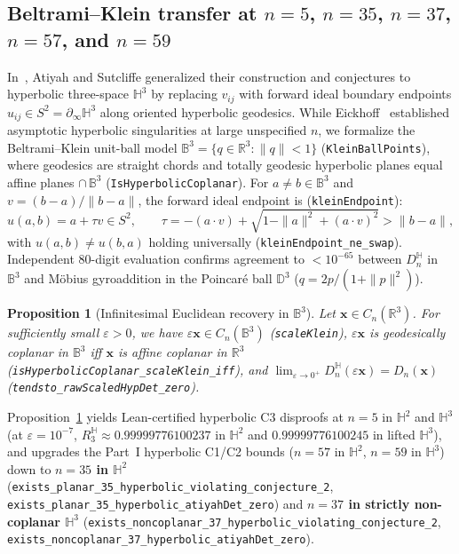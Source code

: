 \documentclass[11pt,reqno]{amsart}
\newtheorem{proposition}[theorem]{Proposition}
\theoremstyle{remark}
\newcommand{\R}{\mathbb{R}}
\newcommand{\B}{\mathbb{B}}
\newcommand{\Hy}{\mathbb{H}}
\begin{document}
\subsection{Beltrami--Klein transfer at $n = 5$, $n = 35$, $n = 37$, $n = 57$, and $n = 59$}
In~\cite[\S6]{AtiyahSutcliffe2002}, Atiyah and Sutcliffe generalized their construction and conjectures to hyperbolic three-space $\Hy^3$ by replacing $v_{ij}$ with forward ideal boundary endpoints $u_{ij} \in S^2 = \partial_\infty \Hy^3$ along oriented hyperbolic geodesics.
While Eickhoff~\cite[\S7]{Eickhoff2026} established asymptotic hyperbolic singularities at large unspecified $n$, we formalize the Beltrami--Klein unit-ball model $\B^3 = \{q \in \R^3 : \|q\| < 1\}$ (\texttt{KleinBallPoints}), where geodesics are straight chords and totally geodesic hyperbolic planes equal affine planes $\cap\,\B^3$ (\texttt{IsHyperbolicCoplanar}).
For $a \ne b \in \B^3$ and $v = (b - a)/\|b - a\|$, the forward ideal endpoint is (\texttt{kleinEndpoint}):
\[
  u(a, b) = a + \tau v \in S^2, \qquad
  \tau = -(a \cdot v) + \sqrt{1 - \|a\|^2 + (a \cdot v)^2} > \|b - a\|,
\]
with $u(a, b) \ne u(b, a)$ holding universally (\texttt{kleinEndpoint\_ne\_swap}).
Independent $80$-digit evaluation confirms agreement to $< 10^{-65}$ between $D_n^{\Hy}$ in $\B^3$ and M\"obius gyroaddition in the Poincar\'e ball $\mathbb{D}^3$ ($q = 2p/(1 + \|p\|^2)$).

\begin{proposition}[Infinitesimal Euclidean recovery in $\B^3$]\label{prop:hyp-limit}
Let $\mathbf{x} \in C_n(\R^3)$. For sufficiently small $\varepsilon > 0$, we have $\varepsilon \mathbf{x} \in C_n(\B^3)$ (\texttt{scaleKlein}), $\varepsilon \mathbf{x}$ is geodesically coplanar in $\B^3$ iff $\mathbf{x}$ is affine coplanar in $\R^3$ (\texttt{isHyperbolic\allowbreak Coplanar\_scaleKlein\_iff}), and $\lim_{\varepsilon \to 0^+} D_n^{\Hy}(\varepsilon \mathbf{x}) = D_n(\mathbf{x})$ (\texttt{tendsto\_rawScaledHypDet\_zero}).
\end{proposition}

Proposition~\ref{prop:hyp-limit} yields Lean-certified hyperbolic C3 disproofs at $n = 5$ in $\Hy^2$ and $\Hy^3$ (at $\varepsilon = 10^{-7}$, $R_3^{\Hy} \approx 0.99999776100237$ in $\Hy^2$ and $0.99999776100245$ in lifted $\Hy^3$), and upgrades the Part~I hyperbolic C1/C2 bounds ($n = 57$ in $\Hy^2$, $n = 59$ in $\Hy^3$) down to \textbf{$n = 35$ in $\Hy^2$} (\texttt{exists\_planar\_35\_hyperbolic\_violating\_conjecture\_2}, \texttt{exists\_planar\_35\_hyperbolic\_atiyahDet\_zero}) and \textbf{$n = 37$ in strictly non-coplanar $\Hy^3$} (\texttt{exists\_noncoplanar\_37\_hyperbolic\_violating\_conjecture\_2}, \texttt{exists\_noncoplanar\_37\_hyperbolic\_atiyahDet\_zero}).
\end{document}
